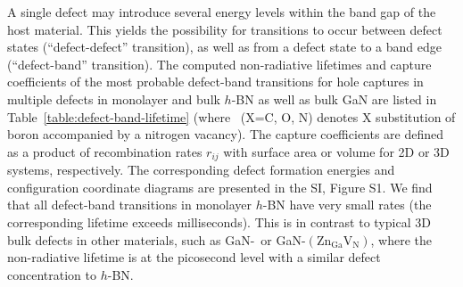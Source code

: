 A single defect may introduce several energy levels within the band gap of the host material. This yields the possibility for transitions to occur between defect states (``defect-defect'' transition), as well as from a defect state to a band edge (``defect-band'' transition). The computed non-radiative lifetimes and capture coefficients of the most probable defect-band transitions for hole captures in multiple defects in monolayer and bulk $h$-BN as well as bulk GaN are listed in Table~\ref{table:defect-band-lifetime} (where \XBVN\ (X=C, O, N) denotes X substitution of boron accompanied by a nitrogen vacancy). The capture coefficients are defined as a product of recombination rates $r_{ij}$ with surface area or volume for 2D or 3D systems, respectively. The corresponding defect formation energies and configuration coordinate diagrams are presented in the SI, Figure S1.
We find that all defect-band transitions in monolayer $h$-BN have very small rates (the corresponding lifetime exceeds milliseconds). This is in contrast to typical 3D bulk defects in other materials, such as GaN-\CN\ or GaN-$(\mathrm{Zn_{Ga}V_N})$, where the non-radiative lifetime is at the picosecond level with a similar defect concentration to $h$-BN.~\cite{shi2012ab,alkauskas2014first2,reshchikov2014carrier}

